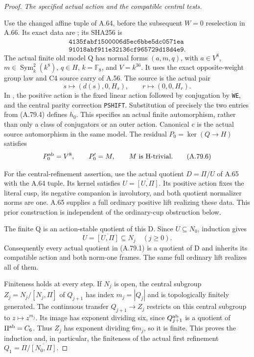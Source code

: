 \begin{proof}
\emph{The specified actual action and the compatible central tests.}\par
Use the changed affine tuple of A.64, before the subsequent
\(W=0\) reselection in A.66. Its exact data are
; its SHA256 is
\[
\begin{gathered}
 \texttt{4135fabf1500006d5ec6bbe5dc0571ea}\\
 \texttt{91018abf911e32136cf965729d18d4e9}.
\end{gathered}
 \tag{A.79.4}
\]
The actual finite old model Q has normal forms
\((a,m,q)\), with \(a\in V^8\),
\(m\in\operatorname{Sym}^2_k(k^8)\), \(q\in H\),
\(k=\mathbb F_8\), and \(V=k^{36}\). It uses the exact
opposite-weight group law and C4 source carry of A.56.
The source is the actual pair
\[
 s\longmapsto(d(s),0,H_s),\qquad
 r\longmapsto(0,0,H_r).
 \tag{A.79.5}
\]
In , the positive action
is the fixed linear action followed by conjugation by
\texttt{WE}, and the central parity correction
\texttt{PSHIFT}. Substitution of precisely the two entries from
(A.79.4) defines \(h_0\). This specifies an actual finite
automorphism, rather than only a class of conjugators or an
outer action. Canonical c is the actual source automorphism in
the same model. The residual \(P_0=\ker(Q\to H)\) satisfies
\[
              P_0^{\rm ab}=V^8,
 \qquad P_0'=M,
 \qquad M\text{ is H-trivial}.
 \tag{A.79.6}
\]

For the central-refinement assertion, use the actual quotient
\(D=\Pi/U\) of A.65 with the A.64 tuple. Its kernel satisfies
\(U=\overline{[U,\Pi]}\). Its positive action fixes the literal
cusp, its negative companion is involutory, and both quotient
normalizer norms are one. A.65 supplies a full ordinary positive
lift realizing these data. This prior construction is independent
of the ordinary-cup obstruction below.

The finite Q is an action-stable quotient of this D. Since
\(U\subseteq N_0\), induction gives
\[
 U=\overline{[U,\Pi]}\subseteq N_j\quad(j\geq0).
 \tag{A.79.7}
\]
Consequently every actual quotient in (A.79.1) is a quotient of D
and inherits its compatible action and both norm-one frames.
The same full ordinary lift realizes all of them.

Finiteness holds at every step. If \(N_j\) is open, the central
subgroup
\(Z_j=N_j/\overline{[N_j,\Pi]}\) of \(Q_{j+1}\)
has index \(m_j=|Q_j|\) and is topologically finitely generated.
The continuous transfer \(Q_{j+1}\to Z_j\) restricts on this
central subgroup to \(z\mapsto z^{m_j}\). Its image has exponent
dividing six, since \(Q_{j+1}^{\rm ab}\) is a quotient of
\(\Pi^{\rm ab}=C_6\). Thus \(Z_j\) has exponent dividing \(6m_j\),
so it is finite. This proves the induction and, in particular,
the finiteness of the actual first refinement
\(Q_1=\Pi/\overline{[N_0,\Pi]}\).


\end{proof}
